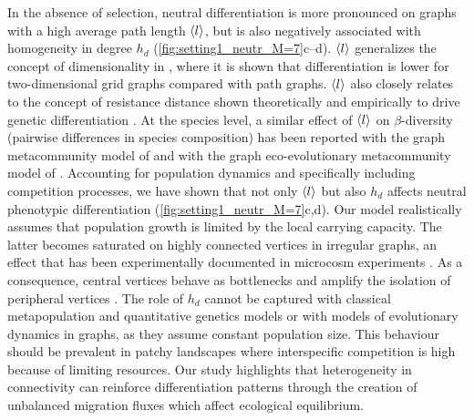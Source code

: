 In the absence of selection, neutral differentiation is more pronounced on graphs with a high average path length $\langle l \rangle$, but is also negatively associated with homogeneity in degree $h_d$ (\cref{fig:setting1_neutr_M=7}c--d).
%
$\langle l \rangle$ generalizes the concept of dimensionality in \citep{Kimura1964,Lande1991,Nagylaki1994}, where it is shown that differentiation is lower for two-dimensional grid graphs compared with path graphs. $\langle l \rangle$ also closely relates to the concept of resistance distance shown theoretically and empirically to drive genetic differentiation \citep{McRae2006,McRae2007}.
%
At the species level, a similar effect of $\langle l \rangle$ on $\beta$-diversity (pairwise differences in species composition) has been reported with the graph metacommunity model of \citep{Carrara2012} and with the graph eco-evolutionary metacommunity model of \citep{Economo2007}.
%
Accounting for population dynamics and specifically including competition processes, we have shown that not only $\langle l \rangle$ but also $h_d$ affects neutral phenotypic differentiation (\cref{fig:setting1_neutr_M=7}c,d).
%
Our model realistically assumes that population growth is limited by the local carrying capacity. The latter becomes saturated on highly connected vertices in irregular graphs, an effect that has been experimentally documented in microcosm experiments \citep{Altermatt2018}. As a consequence, central vertices behave as bottlenecks and amplify the isolation of peripheral vertices \citep{Orsini2013}.
%
The role of $h_d$ cannot be captured with classical metapopulation and quantitative genetics models or with models of evolutionary dynamics in graphs, as they assume constant population size.
% 
This behaviour should be prevalent in patchy landscapes where interspecific competition is high because of limiting resources.
%
Our study highlights that heterogeneity in connectivity can reinforce differentiation patterns through the creation of unbalanced migration fluxes which affect ecological equilibrium.

